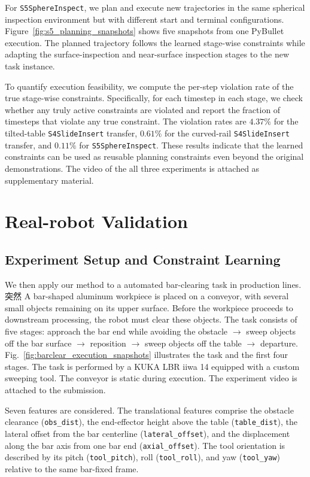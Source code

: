 \documentclass[lettersize,journal]{IEEEtran}
\begin{document}
For \texttt{S5SphereInspect}, we plan and execute new trajectories in the same spherical inspection environment but with different start and terminal configurations. Figure~\ref{fig:s5_planning_snapshots} shows five snapshots from one PyBullet execution. The planned trajectory follows the learned stage-wise constraints while adapting the surface-inspection and near-surface inspection stages to the new task instance.

To quantify execution feasibility, we compute the per-step violation rate of the true stage-wise constraints. Specifically, for each timestep in each stage, we check whether any truly active constraints are violated and report the fraction of  timesteps that violate any true constraint. The violation rates are $4.37\%$ for the tilted-table \texttt{S4SlideInsert} transfer, $0.61\%$ for the curved-rail \texttt{S4SlideInsert} transfer, and $0.11\%$ for \texttt{S5SphereInspect}. These results indicate that the learned constraints can be used as reusable planning constraints even beyond the original demonstrations. The video of the all three experiments is attached as supplementary material.

\section{Real-robot Validation}
\subsection{Experiment Setup and Constraint Learning}
We then apply our method to a automated bar-clearing task in production lines. 突然 A bar-shaped aluminum workpiece is placed on a conveyor, with several small objects remaining on its upper surface. Before the workpiece proceeds to downstream processing, the robot must clear these objects. The task consists of five stages: approach the bar end while avoiding the obstacle $\rightarrow$  sweep objects off the bar surface $\rightarrow$ reposition $\rightarrow$ sweep objects off the table $\rightarrow$ departure. Fig.~\ref{fig:barclear_execution_snapshots} illustrates the task and the first four stages. The task is performed by a KUKA LBR iiwa 14 equipped with a custom sweeping tool. The conveyor is static during execution. The experiment video is attached to the submission. 

Seven features are considered. The translational features comprise the obstacle clearance (\texttt{obs\_dist}), the end-effector height above the table (\texttt{table\_dist}), the lateral offset from the bar centerline (\texttt{lateral\_offset}), and the displacement along the bar axis from one bar end (\texttt{axial\_offset}). The tool orientation is described by its pitch (\texttt{tool\_pitch}), roll (\texttt{tool\_roll}), and yaw (\texttt{tool\_yaw}) relative to the same bar-fixed frame.
\end{document}
